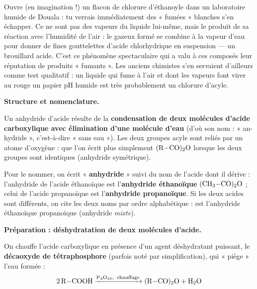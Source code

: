 \documentclass[11pt]{article}
\newcounter{popsec}
\newcounter{popsub}
\newcommand{\courssub}[1]{%
  \stepcounter{popsub}%
  \par\vspace{9pt}\noindent{\popxbold\fontsize{11.5}{13}\selectfont\color{popink}{\color{poporange}\thepopsec.\thepopsub}\hspace{6pt}#1}\par\nopagebreak\vspace{4pt}
}
\begin{document}
\begin{savaistu}
Ouvre (en imagination !) un flacon de chlorure d'éthanoyle  dans un laboratoire humide de Douala : tu verrais immédiatement des « fumées » blanches s'en échapper. Ce ne sont pas des vapeurs du liquide lui-même, mais le produit de sa réaction avec l'humidité de l'air : le  gazeux formé se combine à la vapeur d'eau pour donner de fines gouttelettes d'acide chlorhydrique en suspension — un brouillard acide. C'est ce phénomène spectaculaire qui a valu à ces composés leur réputation de produits « fumants ». Les anciens chimistes s'en servaient d'ailleurs comme test qualitatif : un liquide qui fume à l'air et dont les vapeurs font virer au rouge un papier pH humide est très probablement un chlorure d'acyle.
\end{savaistu}

\courssub{Les anhydrides d'acide}

\textbf{Structure et nomenclature.}\par

Un anhydride d'acide résulte de la \textbf{condensation de deux molécules d'acide carboxylique avec élimination d'une molécule d'eau} (d'où son nom : « an-hydride », c'est-à-dire « sans eau »). Les deux groupes acyle sont reliés par un atome d'oxygène :  que l'on écrit plus simplement $\ce{(R-CO)2O}$ lorsque les deux groupes sont identiques (anhydride symétrique).

Pour le nommer, on écrit « \textbf{anhydride} » suivi du nom de l'acide dont il dérive : l'anhydride de l'acide éthanoïque est l'\textbf{anhydride éthanoïque} $\ce{(CH3-CO)2O}$ ; celui de l'acide propanoïque est l'\textbf{anhydride propanoïque}. Si les deux acides sont différents, on cite les deux noms par ordre alphabétique :  est l'anhydride éthanoïque propanoïque (anhydride \emph{mixte}).

\textbf{Préparation : déshydratation de deux molécules d'acide.}\par

On chauffe l'acide carboxylique en présence d'un agent déshydratant puissant, le \textbf{décaoxyde de tétraphosphore } (parfois noté  par simplification), qui « piège » l'eau formée :
\[ \ce{2 R-COOH ->[\ce{P4O10},\ \text{chauffage}] (R-CO)2O + H2O} \]
\end{document}
